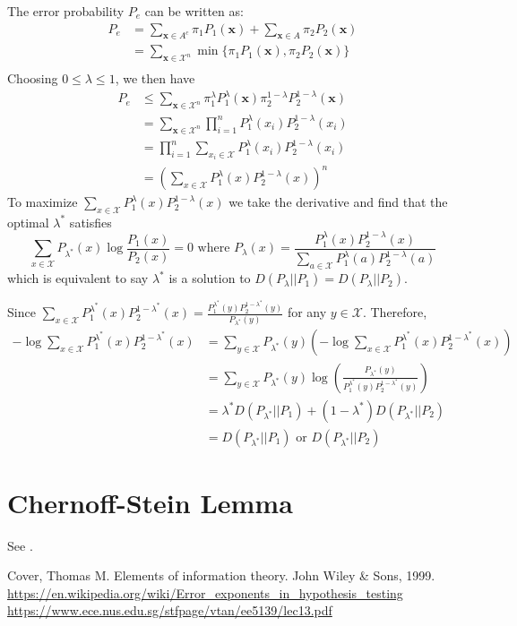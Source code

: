 \documentclass{article}
\begin{document}
The error probability $P_e$ can be written as:
\begin{align*}
P_e & = \sum_{\bm{x} \in A^c} \pi_1 P_1(\bm{x})
+ \sum_{\bm{x} \in A} \pi_2 P_2(\bm{x}) \\
& = \sum_{\bm{x} \in \mathcal{X}^n} \min \{ \pi_1 P_1(\bm{x}), \pi_2 P_2(\bm{x})\} \\
\end{align*}
Choosing $ 0 \leq \lambda \leq 1 $,
we then have
\begin{align*}
P_e & \leq \sum_{\bm{x} \in \mathcal{X}^n}  \pi_1^{\lambda} P_1^{\lambda}(\bm{x}) \pi_2^{1-\lambda} P_2^{1-\lambda}(\bm{x}) \\
& =  \sum_{\bm{x} \in \mathcal{X}^n}  \prod_{i=1}^n P_1^{\lambda}(x_i)  P_2^{1-\lambda}(x_i) \\
& = \prod_{i=1}^n \sum_{x_i\in \mathcal{X}} P_1^{\lambda}(x_i)  P_2^{1-\lambda}(x_i) \\
& = \left(\sum_{x\in \mathcal{X}} P_1^{\lambda}(x)  P_2^{1-\lambda}(x)\right)^n
\end{align*}
To maximize $\sum_{x\in \mathcal{X}} P_1^{\lambda}(x)  P_2^{1-\lambda}(x)$ we take the derivative
and find that the optimal $\lambda^*$ satisfies
\begin{equation}
\sum_{x\in \mathcal{X}} P_{\lambda^*}(x) \log \frac{P_1(x)}{P_2(x)} = 0 \textrm{ where }
P_{\lambda}(x) = \frac{P_1^{\lambda}(x)P_2^{1-\lambda}(x)}{\sum_{a\in \mathcal{X}}P_1^{\lambda}(a)P_2^{1-\lambda}(a)}
\end{equation}
which is equivalent to say $\lambda^*$ is a solution to $D(P_{\lambda}|| P_1) = D(P_{\lambda} || P_2)$.

Since $\sum_{x\in \mathcal{X}} P_1^{\lambda^*}(x)  P_2^{1-\lambda^*}(x) = \frac{P_1^{\lambda^*}(y)P_2^{1-\lambda^*}(y)}
{P_{\lambda^*}(y)}$ for any $y\in \mathcal{X}$. Therefore,
\begin{align*}
-\log \sum_{x\in \mathcal{X}} P_1^{\lambda^*}(x)  P_2^{1-\lambda^*}(x) &= \sum_{y \in \mathcal{X}} P_{\lambda^*}(y) \left(-\log \sum_{x\in \mathcal{X}} P_1^{\lambda^*}(x)  P_2^{1-\lambda^*}(x) \right)\\
& = \sum_{y \in \mathcal{X}} P_{\lambda^*}(y) \log\left(\frac{P_{\lambda^*}(y)}{P_1^{\lambda^*}(y)P_2^{1-\lambda^*}(y)}\right) \\
& = \lambda^* D(P_{\lambda^*} || P_1) + (1-\lambda^*) D(P_{\lambda^*} || P_2) \\
& = D(P_{\lambda^*} || P_1) \textrm{ or } D(P_{\lambda^*} || P_2)
\end{align*}
\section{Chernoff-Stein Lemma}
See \cite{steim}.
\begin{thebibliography}{9}
	 Cover, Thomas M. Elements of information theory. John Wiley \& Sons, 1999.
	 \url{https://en.wikipedia.org/wiki/Error_exponents_in_hypothesis_testing}
	 \url{https://www.ece.nus.edu.sg/stfpage/vtan/ee5139/lec13.pdf}
\end{thebibliography}
\end{document}
